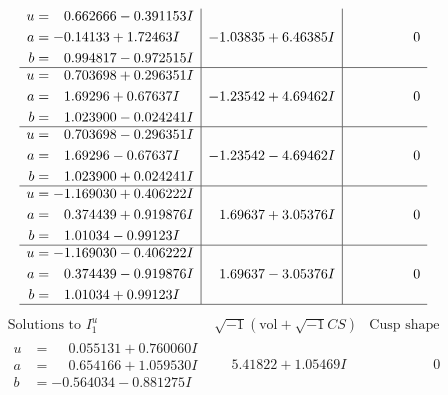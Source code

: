 \documentclass[1p]{elsarticle_modified}
\theoremstyle{definition}
\newcommand{\I}{\sqrt{-1}}
\begin{document}
$$\begin{array}{c|c|c}
\begin{aligned}
u &= \phantom{-}0.662666 - 0.391153 I \\
a &= -0.14133 + 1.72463 I \\
b &= \phantom{-}0.994817 - 0.972515 I\end{aligned}
 & -1.03835 + 6.46385 I & \phantom{-0.000000 } 0 \\ \hline\begin{aligned}
u &= \phantom{-}0.703698 + 0.296351 I \\
a &= \phantom{-}1.69296 + 0.67637 I \\
b &= \phantom{-}1.023900 - 0.024241 I\end{aligned}
 & -1.23542 + 4.69462 I & \phantom{-0.000000 } 0 \\ \hline\begin{aligned}
u &= \phantom{-}0.703698 - 0.296351 I \\
a &= \phantom{-}1.69296 - 0.67637 I \\
b &= \phantom{-}1.023900 + 0.024241 I\end{aligned}
 & -1.23542 - 4.69462 I & \phantom{-0.000000 } 0 \\ \hline\begin{aligned}
u &= -1.169030 + 0.406222 I \\
a &= \phantom{-}0.374439 + 0.919876 I \\
b &= \phantom{-}1.01034 - 0.99123 I\end{aligned}
 & \phantom{-}1.69637 + 3.05376 I & \phantom{-0.000000 } 0 \\ \hline\begin{aligned}
u &= -1.169030 - 0.406222 I \\
a &= \phantom{-}0.374439 - 0.919876 I \\
b &= \phantom{-}1.01034 + 0.99123 I\end{aligned}
 & \phantom{-}1.69637 - 3.05376 I & \phantom{-0.000000 } 0\\
 \hline 
 \end{array}$$\newpage$$\begin{array}{c|c|c}  
\text{Solutions to }I^u_{1}& \I (\text{vol} + \sqrt{-1}CS) & \text{Cusp shape}\\
 \hline 
\begin{aligned}
u &= \phantom{-}0.055131 + 0.760060 I \\
a &= \phantom{-}0.654166 + 1.059530 I \\
b &= -0.564034 - 0.881275 I\end{aligned}
 & \phantom{-}5.41822 + 1.05469 I & \phantom{-0.000000 } 0 \\ \hline\begin{aligned}

\end{aligned}
\end{array}$$
\end{document}
